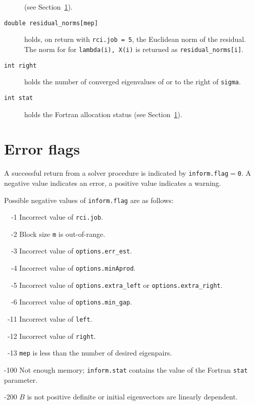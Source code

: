 \begin{description}
(see Section~\ref{ssmfe_expert:errors}).
%
\item[\texttt{double residual\_norms[mep]}] holds, on return with 
{\tt rci.job = 5}, the Euclidean norm of the residual. The norm for
for {\tt lambda(i), X(i)} is returned as {\tt residual\_norms[i]}.
%
\item[\texttt{int right}]
holds the number of converged eigenvalues 
of  or 
to the right of {\tt sigma}.
%
\item[\texttt{int stat}]
holds the Fortran allocation status
(see Section~\ref{ssmfe_expert:errors}).
%
\end{description}

\section{Error flags}

\label{ssmfe_expert:errors}

A successful return from
a solver procedure
is indicated 
by {\tt inform.flag$=$0}.
A negative value indicates an error, a positive value indicates a warning.

Possible negative values of {\tt inform.flag}
are as follows:
%
\begin{description}
%
\item{~~-1}
\hskip 9pt
Incorrect value of {\tt rci.job}.
%
\item{~~-2}
\hskip 9pt
Block size {\tt m} is out-of-range.
%
\item{~~-3}
\hskip 9pt
Incorrect value of 
{\tt options.err\_est}. %
%
\item{~~-4}
\hskip 9pt
Incorrect value of {\tt options.minAprod}.
%
\item{~~-5}
\hskip 9pt
Incorrect value of 
{\tt options.extra\_left} or
{\tt options.extra\_right}.
%
\item{~~-6}
\hskip 9pt
Incorrect value of 
{\tt options.min\_gap}. %
%
\item{~-11}
\hskip 7pt
Incorrect value of 
{\tt left}. %
%
\item{~-12}
\hskip 7pt
Incorrect value of 
{\tt right}. %
%
\item{~-13}
\hskip 7pt
{\tt mep} is less than 
the number of desired eigenpairs.
%
\item{-100}
\hskip 4pt
Not enough memory;
{\tt inform.stat} contains the value of the Fortran {\tt stat} parameter.
%
\item{-200}
\hskip 4pt
$B$ is not positive definite or initial eigenvectors are linearly dependent.
%
\end{description}

